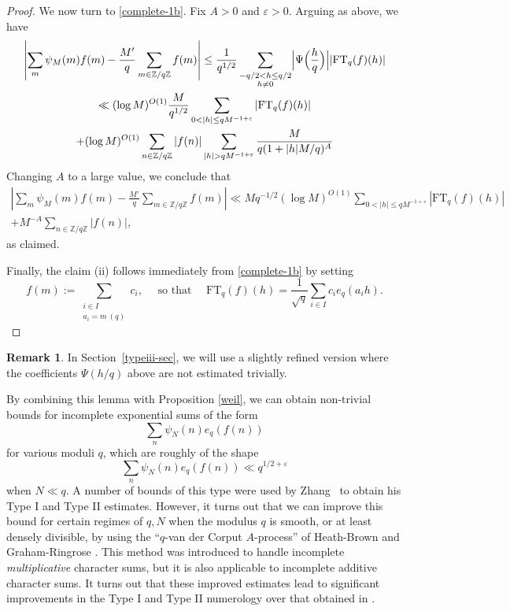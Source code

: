 \documentclass[12pt,a4paper,reqno]{amsart}
\numberwithin{equation}{section}
\newcommand{\FT}{\mathrm{FT}}
\theoremstyle{plain}
\theoremstyle{definition}
\newtheorem{remark}[theorem]{Remark}
\newcommand\Z{\mathbb{Z}}
\newcommand\eps{\varepsilon}
\def\stacksum#1#2{{\stackrel{{\scriptstyle #1}}
{{\scriptstyle #2}}}}
\begin{document}
\begin{proof}
We now turn to \eqref{complete-1b}. Fix $A>0$ and $\eps>0$. Arguing as
above, we have
\begin{multline*}
  \left|\sum_m \psi_M(m) f(m) - \frac{M'}{q} \sum_{m \in \Z/q\Z}
    f(m)\right|\leq \frac{1}{q^{1/2}}\sum_\stacksum{-q/2<h\leq
    q/2}{h\neq 0}\Bigl|\Psi\Bigl(\frac{h}{q}\Bigr)\Bigr|
  |\FT_q(f)(h)| \\
  \ll (\log M)^{O(1)}\frac{M}{q^{1/2}} \sum_{0 < |h| \leq
    qM^{-1+\eps}}
  |\FT_q(f)(h)| \\
  + (\log M)^{O(1)}\sum_{n \in\Z/q\Z} |f(n)| \sum_{|h| > q M^{-1+\eps}}
  \frac{M}{q(1+|h|M/q)^{A}}
\end{multline*}
Changing $A$ to a large value, we conclude that
\begin{multline*}
  \left|\sum_m \psi_M(m) f(m) - \frac{M'}{q} \sum_{m \in \Z/q\Z}
    f(m)\right| \ll Mq^{-1/2}(\log M)^{O(1)} \sum_{0 < |h| \leq
    qM^{-1+\eps}} |\FT_q(f)(h)| \\ + M^{-A}\sum_{n \in\Z/q\Z}
  |f(n)|,
\end{multline*}
as claimed.

Finally, the claim (ii) follows immediately from \eqref{complete-1b}
by setting
$$
f(m) := \sum_{\substack{i \in I\\ a_i = m\ (q)}} c_i,\quad\text{ so that }\quad
\FT_q(f)(h)=\frac{1}{\sqrt{q}}\sum_{i\in I}c_ie_q(a_ih).
$$
\end{proof}

\begin{remark}
  In Section~\ref{typeiii-sec}, we will use a slightly refined version
  where the coefficients $\Psi(h/q)$ above are not estimated
  trivially.
\end{remark}

By combining this lemma with Proposition \ref{weil}, we can obtain
non-trivial bounds for incomplete exponential sums of the form
$$ 
\sum_n \psi_N(n) e_q(f(n))
$$
for various moduli $q$, which are roughly of the shape
$$ 
\sum_n \psi_N(n) e_q(f(n)) \ll q^{1/2+\eps}
$$
when $N \ll q$. A number of bounds of this type were used by Zhang~\cite{zhang} 
to obtain his Type I and Type II estimates.  However, it
turns out that we can improve this bound for certain regimes of $q,N$
when the modulus $q$ is smooth, or at least densely divisible, by
using the ``$q$-van der Corput $A$-process'' of Heath-Brown
\cite{heath-hybrid} and Graham-Ringrose \cite{graham}. This method was
introduced 
to handle incomplete \emph{multiplicative} character sums, but it is
also applicable to incomplete additive character sums.  It turns out
that these improved estimates lead to significant improvements in the
Type I and Type II numerology over that obtained in \cite{zhang}.
\end{document}
